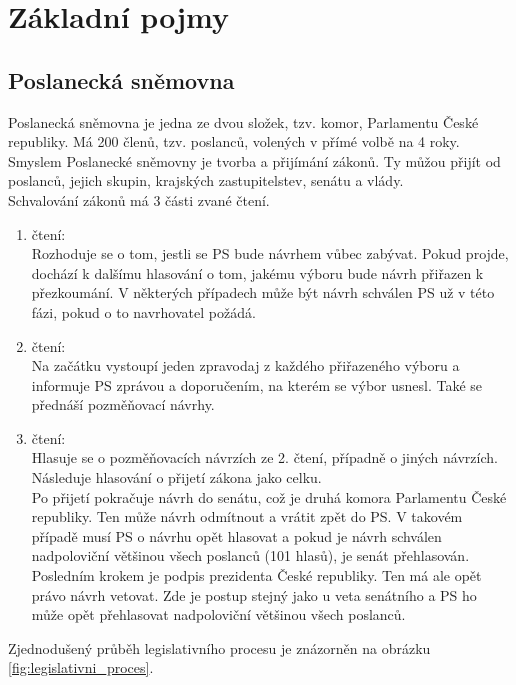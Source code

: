 \section{Základní pojmy}

\subsection{Poslanecká sněmovna}
Poslanecká sněmovna je jedna ze dvou složek, tzv. komor, Parlamentu České republiky. Má 200 členů, tzv. poslanců, volených v přímé volbě na 4 roky. \cite{ustava-parlament} \\
Smyslem Poslanecké sněmovny je tvorba a přijímání zákonů. Ty můžou přijít od poslanců, jejich skupin, krajských zastupitelstev, senátu a vlády. \cite{ustava-navrh_zakona} \\
Schvalování zákonů má 3 části zvané čtení.
\begin{enumerate}
    \item čtení: \\
    Rozhoduje se o tom, jestli se PS bude návrhem vůbec zabývat. Pokud projde, dochází k dalšímu hlasování o tom, jakému výboru bude návrh přiřazen k přezkoumání.
    V některých případech může být návrh schválen PS už v této fázi, pokud o to navrhovatel požádá.
    \item čtení: \\
    Na začátku vystoupí jeden zpravodaj z každého přiřazeného výboru a informuje PS zprávou a doporučením, na kterém se výbor usnesl. Také se přednáší pozměňovací návrhy.
    \item čtení: \\
    Hlasuje se o pozměňovacích návrzích ze 2. čtení, případně o jiných návrzích. Následuje hlasování o přijetí zákona jako celku.\\
    Po přijetí pokračuje návrh do senátu, což je druhá komora Parlamentu České republiky. Ten může návrh odmítnout a vrátit zpět do PS. V takovém případě musí PS o návrhu opět hlasovat a pokud je návrh schválen nadpoloviční většinou všech poslanců (101 hlasů), je senát přehlasován. Posledním krokem je podpis prezidenta České republiky. Ten má ale opět právo návrh vetovat. Zde je postup stejný jako u veta senátního a PS ho může opět přehlasovat nadpoloviční většinou všech poslanců.
\end{enumerate}
Zjednodušený průběh legislativního procesu je znázorněn na obrázku \ref{fig:legislativni_proces}.

